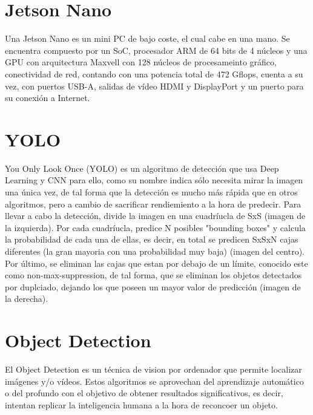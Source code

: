 
\section{Jetson Nano}

Una Jetson Nano \cite{jetsonNano} es un mini PC de bajo coste, el cual cabe en una mano. Se encuentra compuesto por un SoC, procesador ARM de 64 bits de 4 núcleos y una GPU con arquitectura Maxvell con 128 núcleos de procesameinto gráfico, conectividad de red, 
contando con una potencia total de 472 Gflops, cuenta a su vez, con puertos USB-A, salidas de vídeo HDMI y DisplayPort y un puerto para su conexión a Internet.


\section{YOLO}

You Only Look Once (YOLO) \cite{yolov4} es un algoritmo de detección que usa Deep Learning y CNN para ello, como su nombre indica sólo necesita mirar la imagen una única vez, de tal forma que la detección es mucho más rápida que en otros algoritmos, pero a cambio de sacrificar rendiemiento a la hora de predecir.
Para llevar a cabo la detección, divide la imagen en una cuadríucla de SxS (imagen de la izquierda). Por cada cuadríucla, predice N posibles "bounding boxes" y calcula la probabilidad de cada una de ellas, es decir, en total se predicen SxSxN cajas diferentes (la gran mayoria con una probabilidad muy baja) (imagen del centro). 
Por último, se eliminan las cajas que estan por debajo de un límite, conocido este como non-max-suppression, de tal forma, que se eliminan los objetos detectados por duplciado, dejando los que poseen un mayor valor de predicción (imagen de la derecha).



\section{Object Detection}

El Object Detection \cite{objectDetect} es un técnica de vision por ordenador que permite localizar imágenes y/o vídeos. Estos algoritmos se aprovechan del aprendizaje automático o del profundo 
con el objetivo de obtener resultados significativos, es decir, intentan replicar la inteligencia humana a la hora de reconcoer un objeto.

